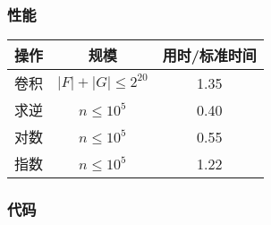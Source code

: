 \subsubsection{性能}

\begin{tabular}{|c|c|c|}
\hline
操作 & 规模 & 用时/标准时间 \\
\hline
卷积 & $|F| + |G| \le 2^{20}$ & 1.35 \\
\hline
求逆 & $n \le 10^5$ & 0.40 \\
\hline
对数 & $n \le 10^5$ & 0.55 \\
\hline
指数 & $n \le 10^5$ & 1.22 \\
\hline
\end{tabular}

\subsubsection{代码}


